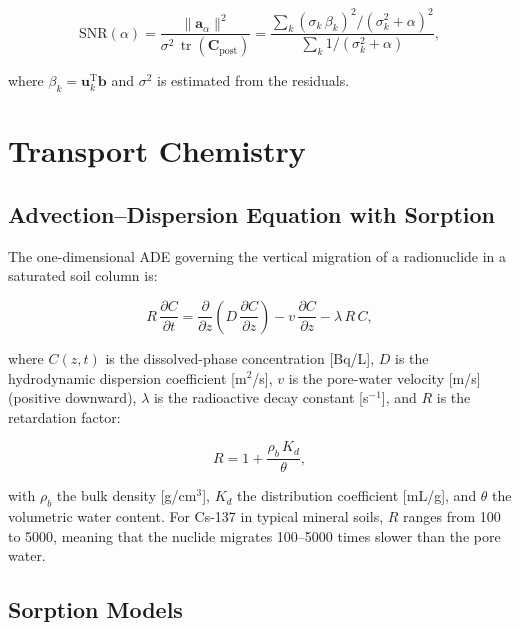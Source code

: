 \documentclass[a4paper,11pt]{article}
\DeclareMathOperator{\tr}{tr}
\begin{document}
\begin{equation}
  \mathrm{SNR}(\alpha) = \frac{\|\bm{a}_\alpha\|^2}{\sigma^2\,\tr(\bm{C}_{\mathrm{post}})} = \frac{\sum_k (\sigma_k\,\beta_k)^2/(\sigma_k^2 + \alpha)^2}{\sum_k 1/(\sigma_k^2 + \alpha)},
\end{equation}

where $\beta_k = \bm{u}_k^\mathrm{T}\bm{b}$ and $\sigma^2$ is estimated from the
residuals.


\section{Transport Chemistry}\label{sec:transport}

\subsection{Advection--Dispersion Equation with Sorption}

The one-dimensional ADE governing the vertical migration of a
radionuclide in a saturated soil column is:

\begin{equation}\label{eq:ade}
  R\,\frac{\partial C}{\partial t} = \frac{\partial}{\partial z}\!
    \left(D\,\frac{\partial C}{\partial z}\right) - v\,\frac{\partial C}{\partial z}
    - \lambda\,R\,C,
\end{equation}

where $C(z,t)$ is the dissolved-phase concentration [Bq/L],
$D$ is the hydrodynamic dispersion coefficient [m$^2$/s],
$v$ is the pore-water velocity [m/s] (positive downward),
$\lambda$ is the radioactive decay constant [s$^{-1}$], and
$R$ is the retardation factor:

\begin{equation}\label{eq:retardation}
  R = 1 + \frac{\rho_b\,K_d}{\theta},
\end{equation}

with $\rho_b$ the bulk density [g/cm$^3$], $K_d$ the distribution
coefficient [mL/g], and $\theta$ the volumetric water content.
For Cs-137 in typical mineral soils, $R$ ranges from 100 to 5000,
meaning that the nuclide migrates 100--5000 times slower than the pore
water.

\subsection{Sorption Models}
\end{document}
